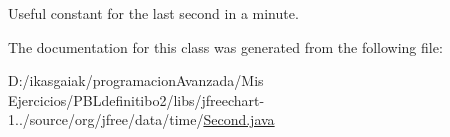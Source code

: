 Useful constant for the last second in a minute. 

The documentation for this class was generated from the following file\+:\begin{DoxyCompactItemize}
\item 
D\+:/ikasgaiak/programacion\+Avanzada/\+Mis Ejercicios/\+P\+B\+Ldefinitibo2/libs/jfreechart-\/1../source/org/jfree/data/time/\mbox{\hyperlink{_second_8java}{Second.\+java}}\end{DoxyCompactItemize}
